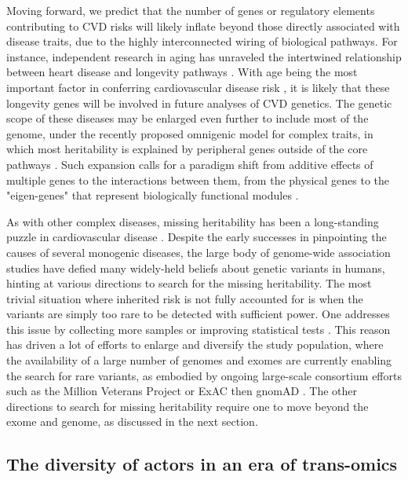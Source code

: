 \documentclass[letter]{bioinfo}
\begin{document}
Moving forward, we predict that the number of genes or regulatory elements contributing to CVD risks will likely inflate beyond those directly associated with disease traits, due to the highly interconnected wiring of biological pathways.  For instance, independent research in aging has unraveled the intertwined relationship between heart disease and longevity pathways \citep{North:2012:Intersection}.  With age being the most important factor in conferring cardiovascular disease risk \citep{Steenman:2017:Cardiac}, it is likely that these longevity genes will be involved in future analyses of CVD genetics. The genetic scope of these diseases may be enlarged even further to include most of the genome, under the recently proposed omnigenic model for complex traits, in which most heritability is explained by peripheral genes outside of the core pathways \citep{Boyle:2017:Expanded}. Such expansion calls for a paradigm shift from additive effects of multiple genes to the interactions between them, from the physical genes to the "eigen-genes" that represent biologically functional modules \citep{Weiss:2012:Good}.
	
As with other complex diseases, missing heritability has been a long-standing puzzle in cardiovascular disease \citep{Manolio:2009:Finding}. Despite the early successes in pinpointing the causes of several monogenic diseases, the large body of genome-wide association studies have defied many widely-held beliefs about genetic variants in humans, hinting at various directions to search for the missing heritability.  The most trivial situation where inherited risk is not fully accounted for is when the variants are simply too rare to be detected with sufficient power. One addresses this issue by collecting more samples or improving statistical tests \citep{Zuk:2014:Searching}.  This reason has driven a lot of efforts to enlarge and diversify the study population, where the availability of a large number of genomes and exomes are currently enabling the search for rare variants, as embodied by ongoing large-scale consortium efforts such as the Million Veterans Project \citep{Gaziano:2016:Million} or ExAC then gnomAD \citep{Lek:2016:Analysis}. The other directions to search for missing heritability require one to move beyond the exome and genome, as discussed in the next section.
	
	
	
	
\subsection*{The diversity of actors in an era of trans-omics}
\end{document}
